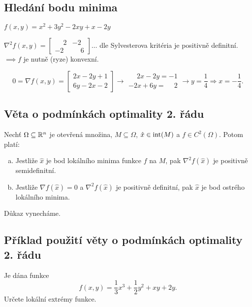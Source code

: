 \subsection{Hledání bodu minima}
$f(x, y) = x^2 + 3y^2 - 2xy + x - 2y$

$\nabla^2 f(x, y) =
\begin{bmatrix}
    \phantom{-}2 & -2 \\
    -2 & \phantom{-}6
\end{bmatrix} \dots$ dle Sylvesterova kritéria je positivně definitní. \\
$\implies f $ je nutně (ryze) konvexní.

\[
    0 = \nabla f(x, y) =
    \begin{bmatrix}
        2x-2y + 1 \\
        6y - 2x -2
    \end{bmatrix} \rightarrow
    \begin{matrix}
    \phantom{-}2x - 2y = -1 \\
    -2x + 6y = \phantom{-}2
    \end{matrix} \rightarrow y = \frac{1}{4} \Rightarrow x = -\frac{1}{4}.
\]

\subsection{Věta o podmínkách optimality 2. řádu}\label{podOpt2}
Nechť $\Omega \subseteq \mathbb{R}^n$ je otevřená množina, $M \subseteq \Omega$, $\hat x \in \operatorname{int}(M)$ a $f \in C^2 (\Omega)$.
Potom platí:
\begin{enumerate}[(a)]
    \item Jestliže $\hat x$ je bod lokálního minima funkce $f$ na $M$, pak $\nabla^2 f(\hat x)$ je positivně
    semidefinitní.
    \item Jestliže $\nabla f(\hat x) = 0$ a $\nabla^2 f(\hat x)$ je positivně definitní, pak $\hat x$ je bod ostrého
    lokálního minima.
\end{enumerate}
Důkaz vynecháme.

\subsection{Příklad použití věty o podmínkách optimality 2. řádu}
Je dána funkce
\[
    f(x, y) = \frac{1}{3}x^3 + \frac{1}{2}y^2 + xy + 2y.
\]
Určete lokální extrémy funkce.

